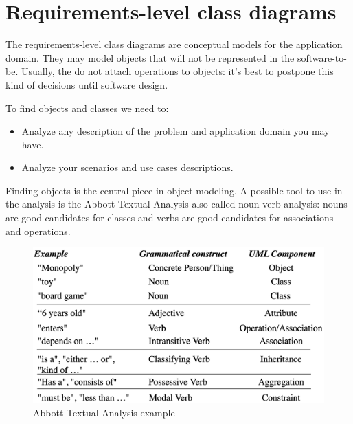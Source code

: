 \documentclass[12pt, a4paper]{report}
\newtheorem[style=M,bodystyle=\normalfont]{theorem}{Theorem}
\newtheorem[style=M,bodystyle=\normalfont]{corollary}{Corollary}
\newtheorem[style=M,bodystyle=\normalfont]{lemma}{Lemma}
\newtheorem[style=M,bodystyle=\normalfont]{definition}{Definition}
\begin{document}
\section{Requirements-level class diagrams}
    The requirements-level class diagrams are conceptual models for the application domain. They may model objects that will not be represented in the software-to-be. Usually, the do not attach operations to objects: it's best to postpone this kind of decisions until software design. 
    \par
    To find objects and classes we need to:
    \begin{itemize}
        \item Analyze any description of the problem and application domain you may have.
        \item Analyze your scenarios and use cases descriptions.
    \end{itemize}
    Finding objects is the central piece in object modeling. A possible tool to use in the analysis is the Abbott Textual Analysis also called noun-verb analysis: nouns are good candidates for classes and verbs are good candidates for associations and operations. 
    \begin{figure}
        \centering
        \includegraphics[width=0.5\linewidth]{images/Abbott.png}
        \caption{Abbott Textual Analysis example}
    \end{figure}
\end{document}
